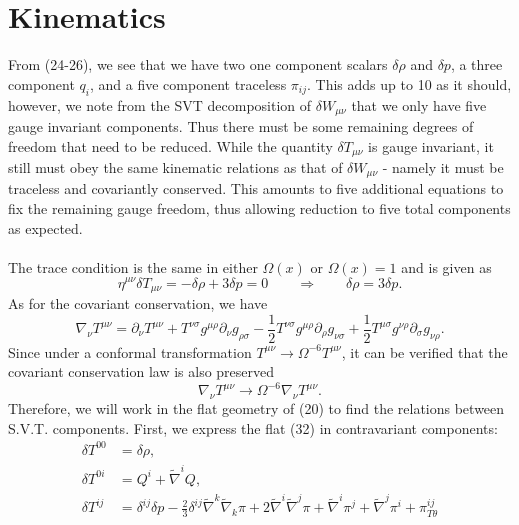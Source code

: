 \documentclass[10pt,letterpaper]{article}
\begin{document}
\section*{Kinematics}
From (24-26), we see that we have two one component scalars $\delta \rho$ and $\delta p$, a three component $q_i$, and a five component traceless $\pi_{ij}$. This adds up to 10 as it should, however, we note from the SVT decomposition of $\delta W_{\mu\nu}$ that we only have five gauge invariant components. Thus there must be some remaining degrees of freedom that need to be reduced. While the quantity $\delta T_{\mu\nu}$ is gauge invariant, it still must obey the same kinematic relations as that of $\delta W_{\mu\nu}$ - namely it must be traceless and covariantly conserved. This amounts to five additional equations to fix the remaining gauge freedom, thus allowing reduction to five total components as expected. 
\\ \\
The trace condition is the same in either $\Omega(x)$ or $\Omega(x) = 1$ and is given as
\begin{equation}
	\eta^{\mu\nu}\delta T_{\mu\nu} = -\delta\rho + 3\delta p=0\qquad \Rightarrow\qquad   \delta \rho = 3\delta p.
\end{equation}
As for the covariant conservation, we have
\begin{equation}
	\nabla_\nu T^{\mu\nu} = \partial_\nu T^{\mu\nu} + T^{\nu\sigma}g^{\mu\rho}\partial_\nu g_{\rho\sigma} - \frac12 T^{\nu\sigma} g^{\mu\rho}\partial_\rho
g_{\nu\sigma} + \frac12 T^{\mu\sigma} g^{\nu\rho} \partial_\sigma g_{\nu\rho}.
\end{equation}
Since under a conformal transformation $T^{\mu\nu} \to \Omega^{-6}T^{\mu\nu}$, it can be verified that the covariant conservation law is also preserved
\begin{equation}
\nabla_\nu T^{\mu\nu} \to \Omega^{-6} \nabla_\nu T^{\mu\nu}.
\end{equation}
Therefore, we will work in the flat geometry of (20) to find the relations between S.V.T. components. First, we express the flat (32) in contravariant components:
\begin{align}
\delta T^{00}  &= \delta \rho,
\nonumber\\	
\delta T^{0i} &=  Q^i + \tilde\nabla^i Q,
\nonumber\\	
\delta T^{ij}  &=  \delta^{ij} \delta p -\frac{2}{3} \delta^{ij}\tilde\nabla^k \tilde\nabla_k \pi + 2\tilde\nabla^i\tilde\nabla^j \pi + \tilde\nabla^i \pi^j + \tilde\nabla^j \pi^i + \pi^{ij}_{T\theta}
\end{align}
\end{document}
